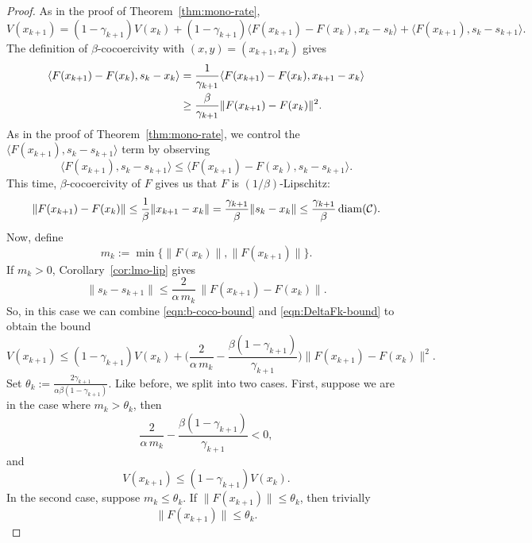 \documentclass[pdflatex,sn-mathphys-num]{sn-jnl}%
\newcommand\diam{\mathop{\rm diam}}
\newcommand\C{\mathcal{C}}
\theoremstyle{thmstyleone}%
\theoremstyle{thmstyletwo}%
\theoremstyle{thmstylethree}%
\begin{document}
\begin{proof}
  As in the proof of Theorem~\ref{thm:mono-rate},
  \[
    V(x_{k+1}) = (1-\gamma_{k+1})V(x_k) + (1-\gamma_{k+1})\langle F(x_{k+1}) - F(x_k), x_k - s_k\rangle + \langle F(x_{k+1}), s_k-s_{k+1}\rangle.
  \]
  The definition of $\beta$-cocoercivity with $(x,y) = (x_{k+1}, x_k)$ gives
  \begin{align} 
    \langle{F(x_{k+1}) - F(x_k), s_k - x_k}\rangle &= \frac{1}{\gamma_{k+1}}\langle{F(x_{k+1}) - F(x_k), x_{k+1} - x_k}\rangle\notag\\
                                                   &\geq \frac{\beta}{\gamma_{k+1}}\lVert F(x_{k+1}) - F(x_k)\rVert^2.\label{eqn:b-coco-bound}
  \end{align}
  As in the proof of Theorem~\ref{thm:mono-rate}, we control the $\langle{F(x_{k+1}), s_k - s_{k+1}}\rangle$ term by observing
  \[
    \langle{F(x_{k+1}), s_k - s_{k+1}}\rangle \leq \langle{F(x_{k+1}) - F(x_k), s_k - s_{k+1}}\rangle.
  \]
  This time, $\beta$-cocoercivity of $F$ gives us that $F$ is $(1/\beta)$-Lipschitz:
  \begin{equation} \label{eqn:DeltaFk-bound}
    \lVert F(x_{k+1}) - F(x_k)\rVert \leq \frac{1}{\beta}\lVert x_{k+1} - x_k\rVert = \frac{\gamma_{k+1}}{\beta}\lVert s_k - x_k \rVert \leq \frac{\gamma_{k+1}}{\beta}\diam(\C).
  \end{equation}
  Now, define
  \[
    m_k := \min\{\|F(x_k)\|,\|F(x_{k+1})\|\}.
  \]
  If $m_k>0$, Corollary~\ref{cor:lmo-lip} gives
  \[
    \|s_k-s_{k+1}\| \leq \frac{2}{\alpha\,m_k}\,\|F(x_{k+1}) - F(x_k)\|.
  \]
  So, in this case we can combine \eqref{eqn:b-coco-bound} and \eqref{eqn:DeltaFk-bound} to obtain the bound
  \begin{equation}\label{eqn:recursion-sc-coco}
    V(x_{k+1}) \leq (1-\gamma_{k+1})V(x_k) + \bigg(\frac{2}{\alpha\, m_k} - \frac{\beta(1-\gamma_{k+1})}{\gamma_{k+1}}\bigg)\lVert F(x_{k+1}) - F(x_k)\rVert^2.
  \end{equation}
  Set $\theta_k := \frac{2\gamma_{k+1}}{\alpha\beta(1-\gamma_{k+1})}$. Like before, we split into two cases.
  First, suppose we are in the case where $m_k > \theta_k$, then
  \[
    \frac{2}{\alpha\, m_k} - \frac{\beta(1-\gamma_{k+1})}{\gamma_{k+1}} < 0,
  \]
  and
  \begin{equation} \label{eqn:mk-gt}
    V(x_{k+1}) \leq (1-\gamma_{k+1})V(x_k).
  \end{equation}
  In the second case, suppose $m_k \leq \theta_k$. If $\lVert F(x_{k+1})\rVert \leq \theta_k$, then trivially
  \[
    \lVert F(x_{k+1})\rVert \leq \theta_k.
\]
\end{proof}
\end{document}
